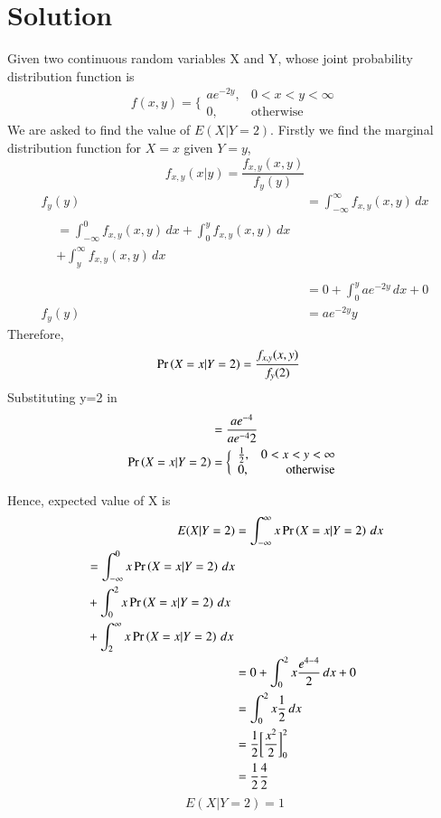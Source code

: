 \documentclass[journal,12pt,twocolumn]{IEEEtran}
\begin{document}
\section{\textbf{Solution}}
Given two continuous random variables X and Y, whose joint probability distribution function is\newline
\begin{equation}
    f(x,y) = \bigg\{ \begin{array}{lr}
    ae^{-2y}, & 0<x<y<\infty  \\
     0, &\text{otherwise} 
\end{array}
\end{equation}
We are asked to find the value of $E(X|Y=2)$. 
Firstly we find the marginal distribution function for $X=x$ given $Y=y$,
\begin{equation}
    f_{x,y}(x|y) = \frac{f_{x,y}(x,y)}{f_y(y)}
\end{equation}
\begin{align}
    f_y(y) &= \int_{-\infty}^{\infty} f_{x,y}(x,y) \,dx \\
    \begin{split}
         &= \int_{-\infty}^{0} f_{x,y}(x,y) \,dx + \int_{0}^{y} f_{x,y}(x,y) \,dx \\
        &+ \int_{y}^{\infty} f_{x,y}(x,y) \,dx\\
    \end{split}\\
    &= 0 + \int_0^y ae^{-2y} \,dx + 0 \\
    f_y(y) &= ae^{-2y}y
\end{align}
Therefore,
\begin{align}
    \Pr\left(X=x|Y=2\right) &= \frac{f_{x,y}(x,y)}{f_y(2)}
    \end{align}
Substituting y=2 in 
\begin{align}
     &= \frac{ae^{-4}}{ae^{-4}2} \\
    \Pr\left(X=x|Y=2\right) &= \bigg\{ \begin{array}{lr}
    \frac{1}{2}, & 0<x<y<\infty  \\
     0, &\text{otherwise} 
\end{array}
\end{align}
   

Hence, expected value of X is
\begin{align}
    E(X|Y=2) &= \int_{-\infty}^{\infty} x\Pr\left(X=x|Y=2\right) \,dx \\
    \begin{split}
        &= \int_{-\infty}^{0} x\Pr\left(X=x|Y=2\right) \,dx \\
        &+ \int_{0}^{2} x\Pr\left(X=x|Y=2\right) \,dx\\
        &+ \int_{2}^{\infty} x\Pr\left(X=x|Y=2\right) \,dx
    \end{split} \\
    &= 0+ \int_{0}^{2} x\frac{e^{4-4}}{2}\,dx  +0 \\
    &= \int_0^2 x\frac{1}{2} \,dx \\
    &= \frac{1}{2}\bigg[\frac{x^2}{2}\bigg]_0^2 \\
    &= \frac{1}{2} \frac{4}{2} 
\end{align}
\begin{equation}
    \boxed{E(X|Y=2) = 1}
\end{equation}
\end{document}
